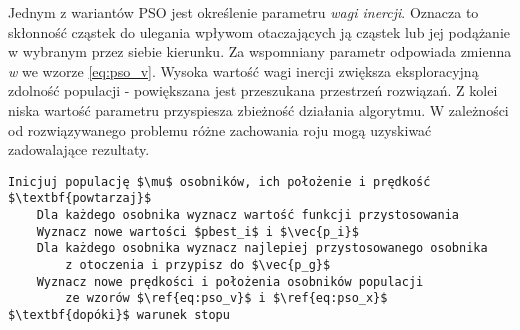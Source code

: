 \par
Jednym z wariantów PSO jest określenie parametru \emph{wagi inercji}. Oznacza to skłonność cząstek do ulegania wpływom otaczających ją cząstek lub jej podążanie w wybranym przez siebie kierunku. Za wspomniany parametr odpowiada zmienna \emph{w} we wzorze \ref{eq:pso_v}. Wysoka wartość wagi inercji zwiększa eksploracyjną zdolność populacji - powiększana jest przeszukana przestrzeń rozwiązań. Z kolei niska wartość parametru przyspiesza zbieżność działania algorytmu. W zależności od rozwiązywanego problemu różne zachowania roju mogą uzyskiwać zadowalające rezultaty.
\begin{lstlisting}[caption=Schemat algorytmu optymalizacji rojem cząstek - \textbf{PSO}, label=lst:pso_pseudocode, mathescape, breaklines=true]
Inicjuj populację $\mu$ osobników, ich położenie i prędkość
$\textbf{powtarzaj}$
    Dla każdego osobnika wyznacz wartość funkcji przystosowania 
    Wyznacz nowe wartości $pbest_i$ i $\vec{p_i}$
    Dla każdego osobnika wyznacz najlepiej przystosowanego osobnika 
        z otoczenia i przypisz do $\vec{p_g}$
    Wyznacz nowe prędkości i położenia osobników populacji
        ze wzorów $\ref{eq:pso_v}$ i $\ref{eq:pso_x}$
$\textbf{dopóki}$ warunek stopu
\end{lstlisting}


